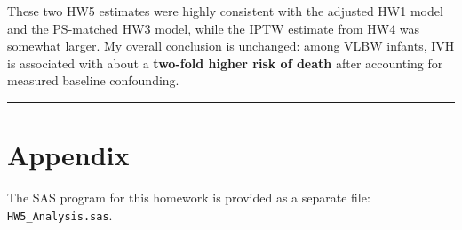 \documentclass[
]{article}
\begin{document}
These two HW5 estimates were highly consistent with the adjusted HW1
model and the PS-matched HW3 model, while the IPTW estimate from HW4 was
somewhat larger. My overall conclusion is unchanged: among VLBW infants,
IVH is associated with about a \textbf{two-fold higher risk of death}
after accounting for measured baseline confounding.

\begin{center}\rule{0.5\linewidth}{0.5pt}\end{center}

\hypertarget{appendix}{%
\section{Appendix}\label{appendix}}

The SAS program for this homework is provided as a separate file:
\texttt{HW5\_Analysis.sas}.
\end{document}
